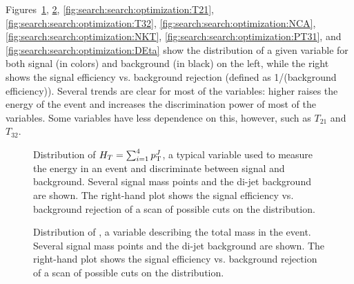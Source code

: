 Figures~\ref{fig:search:search:optimization:HT}, \ref{fig:search:search:optimization:MJ}, \ref{fig:search:search:optimization:T21}, \ref{fig:search:search:optimization:T32}, \ref{fig:search:search:optimization:NCA}, \ref{fig:search:search:optimization:NKT}, \ref{fig:search:search:optimization:PT31}, and \ref{fig:search:search:optimization:DEta} show the distribution of a given variable for both signal (in colors) and background (in black) on the left, while the right shows the signal efficiency vs. background rejection (defined as 1/(background efficiency)). Several trends are clear for most of the variables: higher \mgluino raises the energy of the event and increases the discrimination power of most of the variables. Some variables have less dependence on this, however, such as $T_{21}$ and $T_{32}$.


\begin{figure}
\centering
{}
\label{fig:search:search:optimization:HT}
\caption{Distribution of $H_T = \sum_{i=1}^4 p_{\text{T}}^J$, a typical variable used to measure the energy in an event and discriminate between signal and background. Several signal mass points and the \herwigpp di-jet background are shown. The right-hand plot shows the signal efficiency vs. background rejection of a scan of possible cuts on the \HT distribution.}
\end{figure}




\begin{figure}
\centering
{}
\label{fig:search:search:optimization:MJ}
\caption{Distribution of \MJ, a variable describing the total mass in the event. Several signal mass points and the \herwigpp di-jet background are shown. The right-hand plot shows the signal efficiency vs. background rejection of a scan of possible cuts on the \MJ distribution.}
\end{figure}

